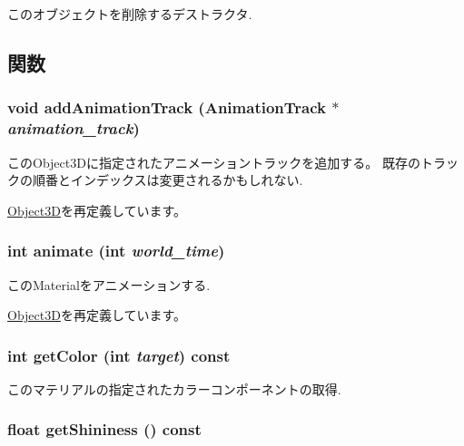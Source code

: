 このオブジェクトを削除するデストラクタ. 

\subsection{関数}
\hypertarget{classm3g_1_1Material_415c0b110f95410ded9b85e5d99a496b}{
\subsubsection[{addAnimationTrack}]{\setlength{\rightskip}{0pt plus 5cm}void addAnimationTrack ({\bf AnimationTrack} $\ast$ {\em animation\_\-track})}}
\label{classm3g_1_1Material_415c0b110f95410ded9b85e5d99a496b}


このObject3Dに指定されたアニメーショントラックを追加する。 既存のトラックの順番とインデックスは変更されるかもしれない. 

\hyperlink{classm3g_1_1Object3D_415c0b110f95410ded9b85e5d99a496b}{Object3D}を再定義しています。\hypertarget{classm3g_1_1Material_8aad1ceab4c2a03609c8a42324ce484d}{
\subsubsection[{animate}]{\setlength{\rightskip}{0pt plus 5cm}int animate (int {\em world\_\-time})}}
\label{classm3g_1_1Material_8aad1ceab4c2a03609c8a42324ce484d}


このMaterialをアニメーションする. 

\hyperlink{classm3g_1_1Object3D_8aad1ceab4c2a03609c8a42324ce484d}{Object3D}を再定義しています。\hypertarget{classm3g_1_1Material_d5740043584c6bf87bf014402c5985be}{
\subsubsection[{getColor}]{\setlength{\rightskip}{0pt plus 5cm}int getColor (int {\em target}) const}}
\label{classm3g_1_1Material_d5740043584c6bf87bf014402c5985be}


このマテリアルの指定されたカラーコンポーネントの取得. \hypertarget{classm3g_1_1Material_1bab082fe3510dbe7b98dd07b3976b5b}{
\subsubsection[{getShininess}]{\setlength{\rightskip}{0pt plus 5cm}float getShininess () const}}
\label{classm3g_1_1Material_1bab082fe3510dbe7b98dd07b3976b5b}


